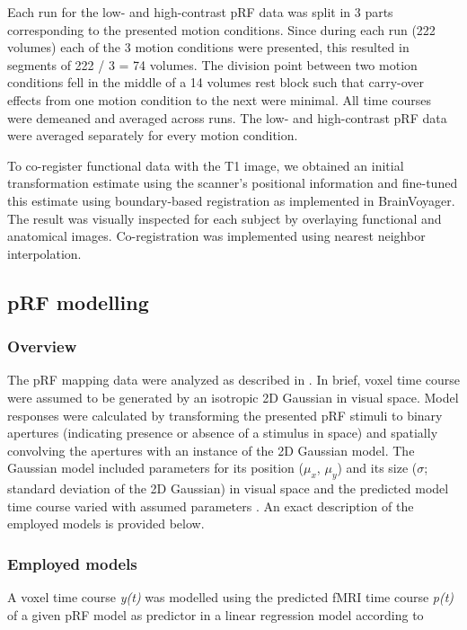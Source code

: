 Each run for the low- and high-contrast pRF data was split in 3 parts corresponding to the presented motion conditions. Since during each run (222 volumes) each of the 3 motion conditions were presented, this resulted in segments of 222 / 3 = 74 volumes. The division point between two motion conditions fell in the middle of a 14 volumes rest block such that carry-over effects from one motion condition to the next were minimal. All time courses were demeaned and averaged across runs. The low- and high-contrast pRF data were averaged separately for every motion condition.

To co-register functional data with the T1 image, we obtained an initial transformation estimate using the scanner’s positional information and fine-tuned this estimate using boundary-based registration \parencite{Greve2009} as implemented in BrainVoyager. The result was visually inspected for each subject by overlaying functional and anatomical images. Co-registration was implemented using nearest neighbor interpolation.

\subsection{pRF modelling}

\subsubsection{Overview}
The pRF mapping data were analyzed as described in \cite{Dumoulin2008, Harvey2011, Zuiderbaan2012, Kay2013, Kay2015}. In brief, voxel time course were assumed to be generated by an isotropic 2D Gaussian in visual space. Model responses were calculated by transforming the presented pRF stimuli to binary apertures (indicating presence or absence of a stimulus in space) and spatially convolving the apertures with an instance of the 2D Gaussian model. The Gaussian model included parameters for its position ($\mu_x$, $\mu_y$) and its size ($\sigma$; standard deviation of the 2D Gaussian) in visual space and the predicted model time course varied with assumed parameters \parencite{Dumoulin2008}. An exact description of the employed models is provided below.

\subsubsection{Employed models}
A voxel time course \textit{y(t)} was modelled using the predicted fMRI time course \textit{p(t)} of a given pRF model as predictor in a linear regression model according to

